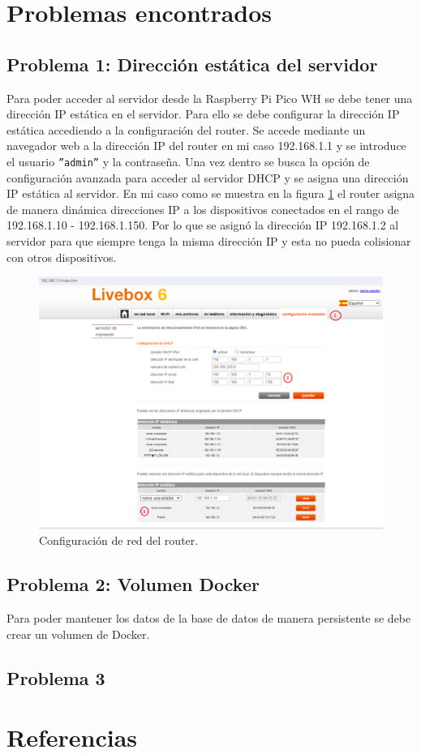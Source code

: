 \documentclass{article}
\begin{document}
\section{Problemas encontrados}
\subsection{Problema 1: Dirección estática del servidor} 
Para poder acceder al servidor desde la Raspberry Pi Pico WH se debe tener una dirección IP estática en el servidor. Para ello se debe configurar la dirección IP estática accediendo a la configuración del router.
Se accede mediante un navegador web a la dirección IP del router en mi caso 192.168.1.1 y se introduce el usuario \texttt{''admin''} y la contraseña. Una vez dentro se busca la opción de configuración avanzada para acceder al servidor DHCP y se asigna una dirección IP estática al servidor.
En mi caso como se muestra en la figura \ref{fig:configuracion router} el router asigna de manera dinámica direcciones IP a los dispositivos conectados en el rango de 192.168.1.10 - 192.168.1.150. Por lo que se asignó la dirección IP 192.168.1.2 al servidor para que siempre tenga la misma dirección IP y esta no pueda colisionar con otros dispositivos.
\begin{figure}[H]
	\raggedright
	\includegraphics[width=1\linewidth]{../images/router_config.png}
	\caption{\label{fig:configuracion router}Configuración de red del router.}
\end{figure}

\subsection{Problema 2: Volumen Docker}
Para poder mantener los datos de la base de datos de manera persistente se debe crear un volumen de Docker.


\subsection{Problema 3}
\section{Referencias}
\end{document}
